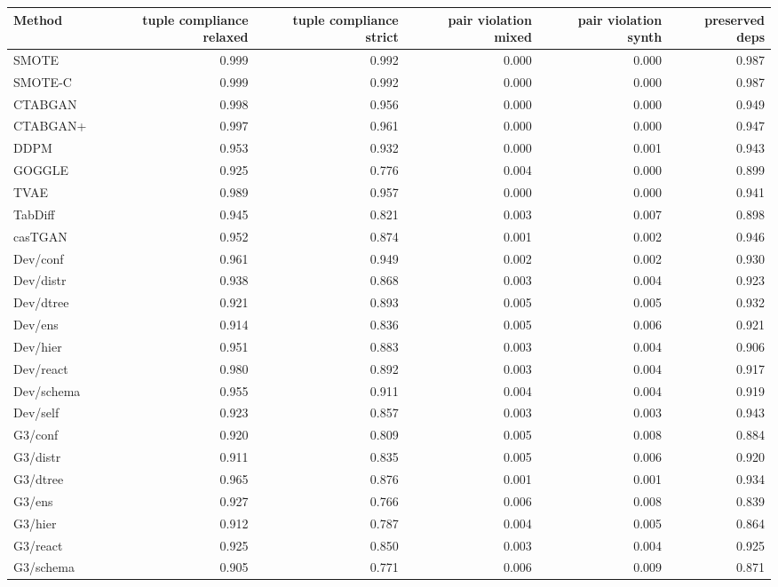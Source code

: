 \begin{table}[t]
\centering
\scriptsize
\setlength\tabcolsep{3pt}
\begin{tabular}{lrrrrr}
\toprule
\textbf{Method} & \textbf{tuple compliance relaxed} & \textbf{tuple compliance strict} & \textbf{pair violation mixed} & \textbf{pair violation synth} & \textbf{preserved deps} \\
\midrule
SMOTE & 0.999 & 0.992 & 0.000 & 0.000 & 0.987 \\
SMOTE-C & 0.999 & 0.992 & 0.000 & 0.000 & 0.987 \\
\midrule
CTABGAN & 0.998 & 0.956 & 0.000 & 0.000 & 0.949 \\
CTABGAN+ & 0.997 & 0.961 & 0.000 & 0.000 & 0.947 \\
DDPM & 0.953 & 0.932 & 0.000 & 0.001 & 0.943 \\
GOGGLE & 0.925 & 0.776 & 0.004 & 0.000 & 0.899 \\
TVAE & 0.989 & 0.957 & 0.000 & 0.000 & 0.941 \\
TabDiff & 0.945 & 0.821 & 0.003 & 0.007 & 0.898 \\
casTGAN & 0.952 & 0.874 & 0.001 & 0.002 & 0.946 \\
\midrule
Dev/conf & 0.961 & 0.949 & 0.002 & 0.002 & 0.930 \\
Dev/distr & 0.938 & 0.868 & 0.003 & 0.004 & 0.923 \\
Dev/dtree & 0.921 & 0.893 & 0.005 & 0.005 & 0.932 \\
Dev/ens & 0.914 & 0.836 & 0.005 & 0.006 & 0.921 \\
Dev/hier & 0.951 & 0.883 & 0.003 & 0.004 & 0.906 \\
Dev/react & 0.980 & 0.892 & 0.003 & 0.004 & 0.917 \\
Dev/schema & 0.955 & 0.911 & 0.004 & 0.004 & 0.919 \\
Dev/self & 0.923 & 0.857 & 0.003 & 0.003 & 0.943 \\
G3/conf & 0.920 & 0.809 & 0.005 & 0.008 & 0.884 \\
G3/distr & 0.911 & 0.835 & 0.005 & 0.006 & 0.920 \\
G3/dtree & 0.965 & 0.876 & 0.001 & 0.001 & 0.934 \\
G3/ens & 0.927 & 0.766 & 0.006 & 0.008 & 0.839 \\
G3/hier & 0.912 & 0.787 & 0.004 & 0.005 & 0.864 \\
G3/react & 0.925 & 0.850 & 0.003 & 0.004 & 0.925 \\
G3/schema & 0.905 & 0.771 & 0.006 & 0.009 & 0.871 \\

\end{tabular}
\end{table}
